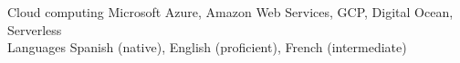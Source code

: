 \begin{cvskills}
\cvskill
{Cloud computing } %
{Microsoft Azure, Amazon Web Services, GCP, Digital Ocean, Serverless } %
\\






\cvskill
{Languages} %
{Spanish (native), English (proficient), French (intermediate)} %
\\

\end{cvskills}